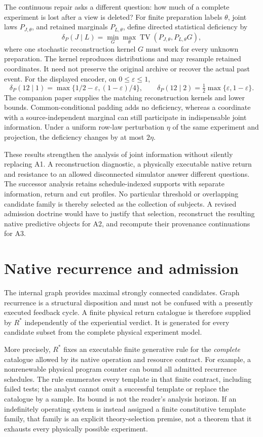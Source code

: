 The continuous repair asks a different question: how much of a complete experiment is lost after a view is deleted? For finite preparation labels $\theta$, joint laws $P_{J,\theta}$, and retained marginals $P_{L,\theta}$, define directed statistical deficiency by
\[
\delta_P(J\mid L)=\min_G\max_\theta
\operatorname{TV}(P_{J,\theta},P_{L,\theta}G),
\]
where one stochastic reconstruction kernel $G$ must work for every unknown preparation. The kernel reproduces distributions and may resample retained coordinates. It need not preserve the original archive or recover the actual past event. For the displayed encoder, on $0\le\varepsilon\le1$,
\[
\delta_P(12\mid1)=\max\{1/2-\varepsilon,(1-\varepsilon)/4\},
\qquad
\delta_P(12\mid2)=\tfrac12\max\{\varepsilon,1-\varepsilon\}.
\]
The companion paper supplies the matching reconstruction kernels and lower bounds. Common-conditional padding adds no deficiency, whereas a coordinate with a source-independent marginal can still participate in indispensable joint information. Under a uniform row-law perturbation $\eta$ of the same experiment and projection, the deficiency changes by at most $2\eta$.

These results strengthen the analysis of joint information without silently replacing A1. A reconstruction diagnostic, a physically executable native return and resistance to an allowed disconnected simulator answer different questions. The successor analysis retains schedule-indexed supports with separate information, return and cut profiles. No particular threshold or overlapping candidate family is thereby selected as the collection of subjects. A revised admission doctrine would have to justify that selection, reconstruct the resulting native predictive objects for A2, and recompute their provenance continuations for A3.

\section{Native recurrence and admission}
\label{sec:spc2-recurrence}
The internal graph provides maximal strongly connected candidates.
Graph recurrence is a structural disposition and must not be confused
with a presently executed feedback cycle. A finite physical return
catalogue is therefore supplied by $R^\ast$ independently of the
experiential verdict. It is generated for every candidate subset from
the complete physical experiment model.

More precisely, $R^\ast$ fixes an executable finite generative
rule for the \emph{complete} catalogue allowed by its native operation
and resource contract. For example, a nonrenewable physical program
counter can bound all admitted recurrence schedules. The rule enumerates
every template in that finite contract, including failed tests; the
analyst cannot omit a successful template or replace the catalogue by a
sample. Its bound is not the reader's analysis horizon. If an indefinitely
operating system is instead assigned a finite constitutive template
family, that family is an explicit theory-selection premise, not a
theorem that it exhausts every physically possible experiment.

